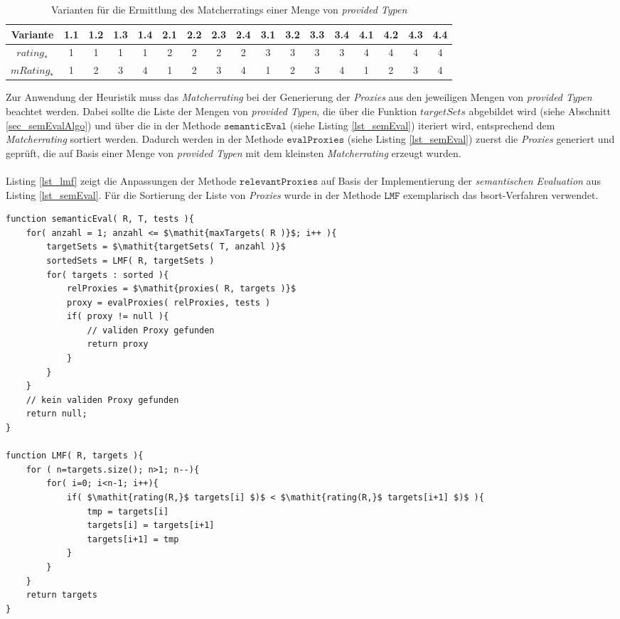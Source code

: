 \begin{table}[h!]
\centering
\small
\begin{tabular}{|c|c|c|c|c|c|c|c|c|c|c|c|c|c|c|c|c|}
\hline
\hline
\textbf{Variante} & 1.1 & 1.2 & 1.3 & 1.4 
& 2.1 & 2.2 & 2.3 & 2.4 
& 3.1 & 3.2 & 3.3 & 3.4 
& 4.1 & 4.2 & 4.3 & 4.4 
\\
\hline
$\mathit{rating}_{*}$& 1 & 1 & 1 & 1
& 2 & 2 & 2 & 2 
& 3 & 3 & 3 & 3 
& 4 & 4 & 4 & 4 
\\
\hline
$\mathit{mRating}_{*}$ & 1 & 2 & 3 & 4 
& 1 & 2 & 3 & 4 
& 1 & 2 & 3 & 4 
& 1 & 2 & 3 & 4 
\\
\hline
\hline
\end{tabular}
\caption{Varianten für die Ermittlung des Matcherratings einer Menge von \emph{provided Typen}}
 \label{tab_matcherratingvarianten}
\end{table}
\noindent
Zur Anwendung der \Gls{Heuristik} muss das \emph{Matcherrating} bei der Generierung der \emph{Proxies} aus den jeweiligen Mengen von \emph{provided Typen} beachtet werden. Dabei sollte die Liste der Mengen von \emph{provided Typen}, die über die Funktion $\mathit{targetSets}$ abgebildet wird (siehe Abschnitt \ref{sec_semEvalAlgo}) und über die in der Methode $\texttt{semanticEval}$ (siehe Listing \ref{lst_semEval}) iteriert wird, entsprechend dem \emph{Matcherrating} sortiert werden. Dadurch werden in der Methode $\texttt{evalProxies}$ (siehe Listing \ref{lst_semEval}) zuerst die \emph{Proxies} generiert und geprüft, die auf Basis einer Menge von \emph{provided Typen} mit dem kleinsten \emph{Matcherrating} erzeugt wurden.
\\\\
Listing \ref{lst_lmf} zeigt die Anpassungen der Methode $\texttt{relevantProxies}$ auf Basis der Implementierung der \emph{semantischen Evaluation} aus Listing \ref{lst_semEval}. Für die Sortierung der Liste von \emph{Proxies} wurde in der Methode $\texttt{LMF}$ exemplarisch das \Gls{bsort}-Verfahren verwendet.

\begin{lstlisting}[style = pseudo, caption=Semantische Evaluation mit Heuristik LMF, captionpos=b, label = lst_lmf]
function semanticEval( R, T, tests ){
	for( anzahl = 1; anzahl <= $\mathit{maxTargets( R )}$; i++ ){
		targetSets = $\mathit{targetSets( T, anzahl )}$
		sortedSets = LMF( R, targetSets )		
		for( targets : sorted ){
			relProxies = $\mathit{proxies( R, targets )}$
			proxy = evalProxies( relProxies, tests )	
			if( proxy != null ){
				// validen Proxy gefunden
				return proxy
			}
		}
	}
	// kein validen Proxy gefunden
	return null;
}

function LMF( R, targets ){
	for	( n=targets.size(); n>1; n--){
		for( i=0; i<n-1; i++){
			if( $\mathit{rating(R,}$ targets[i] $)$ < $\mathit{rating(R,}$ targets[i+1] $)$ ){
				tmp = targets[i]
				targets[i] = targets[i+1]
				targets[i+1] = tmp
			}
		}
	}	
	return targets
}
\end{lstlisting}


